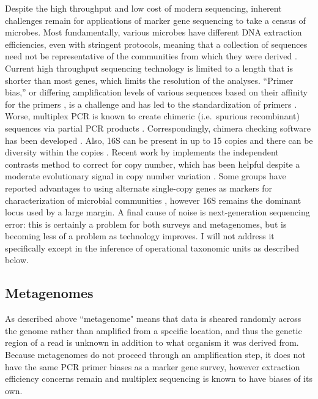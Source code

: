 \documentclass{amsart}
\begin{document}
Despite the high throughput and low cost of modern sequencing, inherent challenges remain for applications of marker gene sequencing to take a census of microbes.
Most fundamentally, various microbes have different DNA extraction efficiencies, even with stringent protocols, meaning that a collection of sequences need not be representative of the communities from which they were derived \citep{morgan2010metagenomic}.
Current high throughput sequencing technology is limited to a length that is shorter than most genes, which limits the resolution of the analyses.
``Primer bias,'' or differing amplification levels of various sequences based on their affinity for the primers \citep{suzuki1996bias,polz1998bias}, is a challenge and has led to the standardization of primers \citep{methe2012framework}.
Worse, multiplex PCR is known to create chimeric (i.e.\ spurious recombinant) sequences via partial PCR products \citep{hugenholtz2003chimeric,ashelford2005least,haas2011chimeric,schloss2011reducing}.
Correspondingly, chimera checking software has been developed \citep[including][]{ashelford2006new,edgar2011uchime}.
Also, 16S can be present in up to 15 copies and there can be diversity within the copies \citep{klappenbach2001rrndb}.
Recent work by \citet{kembel2012incorporating} implements the independent contrasts \citep{felsenstein1985phylogenies} method to correct for copy number, which has been helpful despite a moderate evolutionary signal in copy number variation \citep{klappenbach2000rrna}.
Some groups have reported advantages to using alternate single-copy genes as markers for characterization of microbial communities \citep[e.g.][]{case2007rpob,mcnabb2004hsp65}, however 16S remains the dominant locus used by a large margin.
A final cause of noise is next-generation sequencing error: this is certainly a problem for both surveys and metagenomes, but is becoming less of a problem as technology improves.
I will not address it specifically except in the inference of operational taxonomic units as described below.

\subsection{Metagenomes}
As described above ``metagenome" means that data is sheared randomly across the genome rather than amplified from a specific location, and thus the genetic region of a read is unknown in addition to what organism it was derived from.
Because metagenomes do not proceed through an amplification step, it does not have the same PCR primer biases as a marker gene survey, however extraction efficiency concerns remain and multiplex sequencing is known to have biases of its own.
\end{document}
